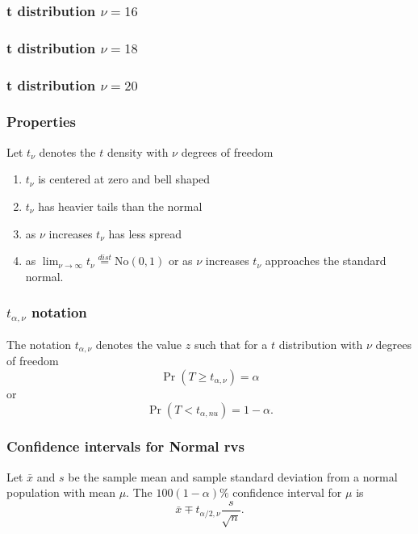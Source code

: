 \begin{frame}[fragile]\frametitle{t distribution $\nu=16$}

\end{frame}

\begin{frame}[fragile]\frametitle{t distribution $\nu=18$}

\end{frame}

\begin{frame}[fragile]\frametitle{t distribution $\nu=20$}

\end{frame}


\begin{frame}[fragile]\frametitle{Properties}

Let $t_{\nu}$ denotes the $t$ density with $\nu$
degrees of freedom

\begin{enumerate}

\item $t_{\nu}$ is centered at zero and bell shaped 
\item $t_{\nu}$ has heavier tails than the normal 
\item as $\nu$ increases $t_{\nu}$ has less spread  
\item as $\lim_{\nu \rightarrow \infty} t_{\nu} \stackrel{dist}{=}
  \mbox{No}(0,1)$ or as $\nu$ increases $t_{\nu}$ approaches the
standard normal.
\end{enumerate}

\end{frame}


\begin{frame}[fragile]\frametitle{$t_{\alpha,\nu}$ notation}

\begin{defn}
The notation $t_{\alpha,\nu}$ denotes the value $z$ such that for
a $t$ distribution  with $\nu$ degrees of freedom 
$$\Pr(T \geq t_{\alpha,\nu}) = \alpha$$ 
or
$$\Pr(T < t_{\alpha,nu}) = 1-\alpha.$$
\end{defn}
\end{frame}


\begin{frame}[fragile]\frametitle{Confidence intervals for Normal rvs}

\begin{defn}
Let $\bar{x}$ and $s$ be the sample mean and sample standard 
deviation from a normal population with mean $\mu$. The
$100(1-\alpha)\%$ confidence interval for $\mu$ is
$$\bar{x} \mp t_{\alpha/2,\nu} \frac{s}{\sqrt{n}}.$$
\end{defn}

\end{frame}

